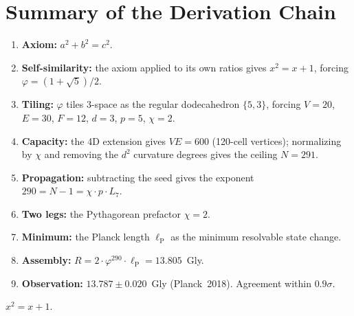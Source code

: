 \documentclass[11pt,a4paper]{article}
\theoremstyle{plain}
\theoremstyle{definition}
\newcommand{\lP}{\ell_{\mathrm{P}}}
\newcommand{\vp}{\varphi}
\begin{document}
\section{Summary of the Derivation Chain}\label{sec:summary}

\begin{enumerate}
  \item \textbf{Axiom:} $a^2 + b^2 = c^2$.
  \item \textbf{Self-similarity:} the axiom applied to its own ratios
    gives $x^2 = x + 1$, forcing $\vp = (1+\sqrt{5})/2$.
  \item \textbf{Tiling:} $\vp$ tiles 3-space as the regular
    dodecahedron $\{5,3\}$, forcing $V = 20$, $E = 30$, $F = 12$,
    $d = 3$, $p = 5$, $\chi = 2$.
  \item \textbf{Capacity:} the 4D extension gives $VE = 600$
    (120-cell vertices); normalizing by $\chi$ and removing the
    $d^2$ curvature degrees gives the ceiling $N = 291$.
  \item \textbf{Propagation:} subtracting the seed gives the exponent
    $290 = N - 1 = \chi \cdot p \cdot L_7$.
  \item \textbf{Two legs:} the Pythagorean prefactor $\chi = 2$.
  \item \textbf{Minimum:} the Planck length $\lP$ as the minimum
    resolvable state change.
  \item \textbf{Assembly:} $R = 2 \cdot \vp^{290} \cdot \lP
    = 13.805$~Gly.
  \item \textbf{Observation:} $13.787 \pm 0.020$~Gly (Planck~2018).
    Agreement within $0.9\sigma$.
\end{enumerate}

\bigskip
\begin{center}
\large $x^2 = x + 1.$
\end{center}
\end{document}
